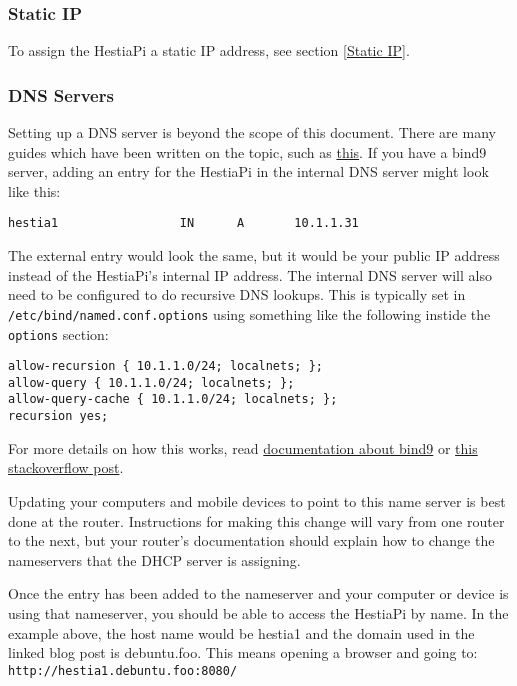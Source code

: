 \subsubsection{Static IP}
To assign the HestiaPi a static IP address, see section \ref{Static IP}.

\subsubsection{DNS Servers} \label{DNS Servers}
Setting up a DNS server is beyond the scope of this document.  There are many
guides which have been written on the topic, such as
\href{https://www.debuntu.org/how-to-setting-up-a-dns-zone-with-bind9/}{this}.
If you have a bind9 server, adding an entry for the HestiaPi in the internal
DNS server might look like this:

\begin{verbatim}
hestia1                 IN      A       10.1.1.31
\end{verbatim}

The external entry would look the same, but it would be your public IP address
instead of the HestiaPi's internal IP address.  The internal DNS server will
also need to be configured to do recursive DNS lookups.  This is typically
set in \texttt{/etc/bind/named.conf.options} using something like the
following instide the \texttt{options} section:

\begin{verbatim}
allow-recursion { 10.1.1.0/24; localnets; };
allow-query { 10.1.1.0/24; localnets; };
allow-query-cache { 10.1.1.0/24; localnets; };
recursion yes;
\end{verbatim}

For more details on how this works, read
\href{https://www.zytrax.com/books/dns/ch7/queries.html}
{documentation about bind9} or
\href{https://serverfault.com/questions/634546/bind9-proper-recursion-setup/634564#634564}
{this stackoverflow post}.

Updating your computers and mobile devices to point to this name server is best
done at the router.  Instructions for making this change will vary from one
router to the next, but your router's documentation should explain how to change
the nameservers that the DHCP server is assigning.

Once the entry has been added to the nameserver and your computer or device is
using that nameserver, you should be able to access the HestiaPi by name.  In
the example above, the host name would be hestia1 and the domain used in the
linked blog post is debuntu.foo.  This means opening a browser and going to:
\texttt{http://hestia1.debuntu.foo:8080/}

